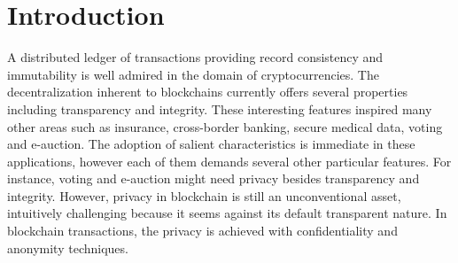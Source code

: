\section{Introduction}
\label{sec-Introduction}
A distributed ledger of transactions providing record consistency and immutability is well admired in the domain of cryptocurrencies. The decentralization inherent to blockchains currently offers several properties including transparency and integrity. These interesting features inspired many other areas such as insurance, cross-border banking, secure medical data, voting and e-auction. The adoption of salient characteristics is immediate in these applications, however each of them demands several other particular features. For instance, voting and e-auction might need privacy besides transparency and integrity. However, privacy in blockchain is still an unconventional asset, intuitively challenging because it seems against its default transparent nature. In blockchain transactions, the privacy is achieved with confidentiality and anonymity techniques. 

